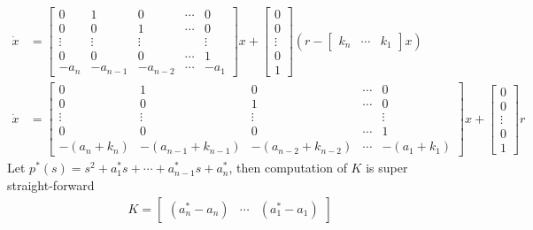 \documentclass[twoside]{article}
\begin{document}
\begin{align*}
\dot{x} &= \left[ \begin{array}{ccccc} 0 & 1 & 0 & \cdots & 0 \\ 0 & 0 & 1 &
                                                                      \cdots & 0
\\ \vdots & \vdots & \vdots & & \vdots
\\ 0 & 0 & 0 & \cdots & 1
    \\ -a_n & -a_{n-1} & -a_{n-2} & \cdots & -a_1 \end{array} \right] x 
+ \left[ \begin{array}{c} 0\\ 0 \\ \vdots \\ 0 \\ 1 \end{array}
  \right] 
 \left( r - 
\left[ \begin{array}{ccc} k_n & \cdots & k_1 \end{array} \right]
x \right)
\\
\dot{x} &= \left[ \begin{array}{ccccc} 0 & 1 & 0 & \cdots & 0 \\ 0 & 0 & 1 &
                                                                      \cdots & 0
\\ \vdots & \vdots & \vdots & & \vdots
\\ 0 & 0 & 0 & \cdots & 1
    \\ -(a_n+k_n) & -(a_{n-1} + k_{n-1}) & -(a_{n-2} + k_{n-2}) &
                                                                  \cdots
                                                         & -(a_1 +
                                                           k_1) \end{array}
                                                           \right] x
+ \left[ \begin{array}{c} 0\\ 0 \\ \vdots \\ 0 \\ 1 \end{array}
  \right] r
\end{align*}
%
Let $p^*(s) = s^2 + a_1^* s + \cdots + a_{n-1}^* s + a_n^*$, then
computation of $K$ is super straight-forward
%
\begin{align*}
  K = \left[ \begin{array}{ccc} (a^*_n - a_n) & \cdots & (a^*_1 - a_1) \end{array} \right]
\end{align*}
\end{document}
